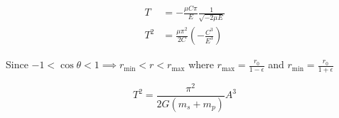 \begin{align}
	T &= - \frac{\mu C \pi}{E} \frac{1}{\sqrt{-2\mu E}}\\
	T^2 &= \frac{\mu \pi^2}{2 C} \left(- \frac{C^3}{E^3}\right)
\end{align}

Since $-1 < \cos\theta < 1 \implies r_\mathrm{min} < r < r_\mathrm{max}$ where $r_\mathrm{max} = \frac{r_0}{1 - \epsilon}$ and $r_\mathrm{min} = \frac{r_0}{1 + \epsilon}$

\begin{equation}
	T^2 = \frac{\pi^2}{2G(m_s + m_p)} A^3
\end{equation}

